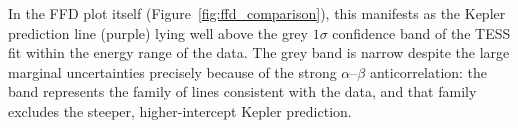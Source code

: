 In the FFD plot itself (Figure~\ref{fig:ffd_comparison}), this
manifests as the Kepler prediction line (purple) lying well above the
grey $1\sigma$ confidence band of the TESS fit within the energy range
of the data.  The grey band is narrow despite the large marginal
uncertainties precisely because of the strong $\alpha$--$\beta$
anticorrelation: the band represents the family of lines consistent
with the data, and that family excludes the steeper, higher-intercept
Kepler prediction.
